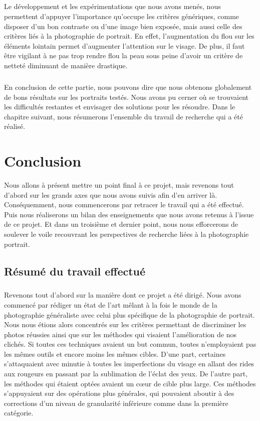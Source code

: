 \documentclass[11pt, french,screen]{report-rd-info}
\begin{document}
\paragraph*{}
Le développement et les expérimentations que nous avons menés, nous permettent d'appuyer l'importance qu'occupe les critères génériques, comme disposer d'un bon contraste ou d'une image bien exposée, mais aussi celle des critères liés à la photographie de portrait. En effet, l'augmentation du flou sur les éléments lointain permet d'augmenter l'attention sur le visage. De plus, il faut être vigilant à ne pas trop rendre flou la peau sous peine d'avoir un critère de netteté diminuant de manière drastique.  
\paragraph*{}
En conclusion de cette partie, nous pouvons dire que nous obtenons globalement de bons résultats sur les portraits testés. Nous avons pu cerner où se trouvaient les difficultés restantes et envisager des solutions pour les résoudre. Dans le chapitre suivant, nous résumerons l'ensemble du travail de recherche qui a été réalisé.




\chapter{Conclusion}
\label{chap:Conclusion}
Nous allons à présent mettre un point final à ce projet, mais revenons tout d'abord sur les grands axes que nous avons suivis afin d'en arriver là. Conséquemment, nous commencerons par retracer le travail qui a été effectué. Puis nous réaliserons un bilan des enseignements que nous avons retenus à l'issue de ce projet. Et dans un troisième et dernier point, nous nous efforcerons de soulever le voile recouvrant les perspectives de recherche liées à la photographie portrait.

\section{Résumé du travail effectué}
\paragraph*{}
Revenons tout d'abord sur la manière dont ce projet a été dirigé. Nous avons commencé par rédiger un état de l'art mêlant à la fois le monde de la photographie généraliste avec celui plus spécifique de la photographie de portrait. Nous nous étions alors concentrés sur les critères permettant de discriminer les photos réussies ainsi que sur les méthodes qui visaient l'amélioration de nos clichés. Si toutes ces techniques avaient un but commun, toutes n'employaient pas les mêmes outils et encore moins les mêmes cibles. D'une part, certaines s'attaquaient avec minutie à toutes les imperfections du visage en allant des rides aux rougeurs en passant par la sublimation de l'éclat des yeux. De l'autre part, les méthodes qui étaient optées avaient un cœur de cible plus large. Ces méthodes s'appuyaient sur des opérations plus générales, qui pouvaient aboutir à des corrections d'un niveau de granularité inférieure comme dans la première catégorie. 
\end{document}

